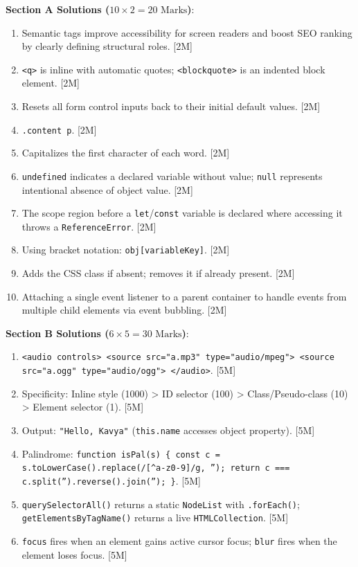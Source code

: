 \begin{solutionbox}
\noindent\textbf{Section A Solutions ($10 \times 2 = 20\text{ Marks}$)}:
\begin{enumerate}
    \item Semantic tags improve accessibility for screen readers and boost SEO ranking by clearly defining structural roles. [2M]
    \item \texttt{<q>} is inline with automatic quotes; \texttt{<blockquote>} is an indented block element. [2M]
    \item Resets all form control inputs back to their initial default values. [2M]
    \item \texttt{.content p}. [2M]
    \item Capitalizes the first character of each word. [2M]
    \item \texttt{undefined} indicates a declared variable without value; \texttt{null} represents intentional absence of object value. [2M]
    \item The scope region before a \texttt{let}/\texttt{const} variable is declared where accessing it throws a \texttt{ReferenceError}. [2M]
    \item Using bracket notation: \texttt{obj[variableKey]}. [2M]
    \item Adds the CSS class if absent; removes it if already present. [2M]
    \item Attaching a single event listener to a parent container to handle events from multiple child elements via event bubbling. [2M]
\end{enumerate}

\medskip
\noindent\textbf{Section B Solutions ($6 \times 5 = 30\text{ Marks}$)}:
\begin{enumerate}[start=11]
    \item \texttt{<audio controls> <source src="a.mp3" type="audio/mpeg"> <source src="a.ogg" type="audio/ogg"> </audio>}. [5M]
    \item Specificity: Inline style (1000) > ID selector (100) > Class/Pseudo-class (10) > Element selector (1). [5M]
    \item Output: \texttt{"Hello, Kavya"} (\texttt{this.name} accesses object property). [5M]
    \item Palindrome: \texttt{function isPal(s) \{ const c = s.toLowerCase().replace(/[\textasciicircum a-z0-9]/g, ''); return c === c.split('').reverse().join(''); \}}. [5M]
    \item \texttt{querySelectorAll()} returns a static \texttt{NodeList} with \texttt{.forEach()}; \texttt{getElementsByTagName()} returns a live \texttt{HTMLCollection}. [5M]
    \item \texttt{focus} fires when an element gains active cursor focus; \texttt{blur} fires when the element loses focus. [5M]
\end{enumerate}


\end{solutionbox}
